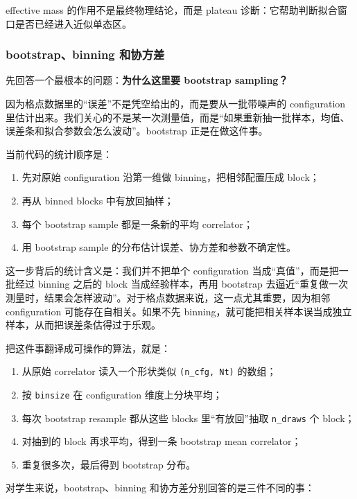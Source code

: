 \documentclass[11pt,a4paper,fontset=fandol]{ctexart}
\begin{document}
effective mass 的作用不是最终物理结论，而是 plateau 诊断：它帮助判断拟合窗口是否已经进入近似单态区。

\subsubsection{bootstrap、binning 和协方差}

先回答一个最根本的问题：\textbf{为什么这里要 bootstrap sampling？}

因为格点数据里的“误差”不是凭空给出的，而是要从一批带噪声的 configuration 里估计出来。我们关心的不是某一次测量值，而是“如果重新抽一批样本，均值、误差条和拟合参数会怎么波动”。bootstrap 正是在做这件事。

当前代码的统计顺序是：

\begin{enumerate}[leftmargin=2em]
  \item 先对原始 configuration 沿第一维做 binning，把相邻配置压成 block；
  \item 再从 binned blocks 中有放回抽样；
  \item 每个 bootstrap sample 都是一条新的平均 correlator；
  \item 用 bootstrap sample 的分布估计误差、协方差和参数不确定性。
\end{enumerate}

这一步背后的统计含义是：我们并不把单个 configuration 当成“真值”，而是把一批经过 binning 之后的 block 当成经验样本，再用 bootstrap 去逼近“重复做一次测量时，结果会怎样波动”。对于格点数据来说，这一点尤其重要，因为相邻 configuration 可能存在自相关。如果不先 binning，就可能把相关样本误当成独立样本，从而把误差条估得过于乐观。

把这件事翻译成可操作的算法，就是：

\begin{enumerate}[leftmargin=2em]
  \item 从原始 correlator 读入一个形状类似 \lstinline|(n_cfg, Nt)| 的数组；
  \item 按 \lstinline|binsize| 在 configuration 维度上分块平均；
  \item 每次 bootstrap resample 都从这些 blocks 里“有放回”抽取 \lstinline|n_draws| 个 block；
  \item 对抽到的 block 再求平均，得到一条 bootstrap mean correlator；
  \item 重复很多次，最后得到 bootstrap 分布。
\end{enumerate}

对学生来说，bootstrap、binning 和协方差分别回答的是三件不同的事：
\end{document}
